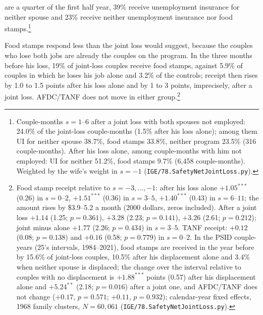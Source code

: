 are a quarter of the first half year, 39\% receive unemployment insurance for neither spouse and 23\% receive neither
unemployment insurance nor food stamps.\footnote{Couple-months $s = 1$--$6$ after a joint loss with both spouses
not employed: 24.0\% of the joint-loss couple-months (1.5\% after his loss alone); among them UI for neither spouse
38.7\%, food stamps 33.8\%, neither program 23.5\% (316 couple-months). After his loss alone, among couple-months with
him not employed: UI for neither 51.2\%, food stamps 9.7\% (6{,}458 couple-months). Weighted by the wife's weight in
$s = -1$ (\texttt{IGE/78.SafetyNetJointLoss.py}).}

Food stamps respond less than the joint loss would suggest, because the couples who lose both jobs are already the
couples on the program. In the three months before his loss, 19\% of joint-loss couples receive food stamps, against
5.9\% of couples in which he loses his job alone and 3.2\% of the controls; receipt then rises by 1.0 to 1.5 points after
his loss alone and by 1 to 3 points, imprecisely, after a joint loss. AFDC/TANF does not move in either
group.\footnote{Food stamp receipt relative to $s = -3, \dots, -1$: after his loss alone $+1.05^{***}$ (0.26) in
$s = 0$--$2$, $+1.51^{***}$ (0.36) in $s = 3$--$5$, $+1.40^{***}$ (0.43) in $s = 6$--$11$; the amount rises by
\$3.9--5.2 a month (2000 dollars, zeros included). After a joint loss $+1.14$ (1.25; $p=0.361$), $+3.28$ (2.23;
$p=0.141$), $+3.26$ (2.61; $p=0.212$); joint minus alone $+1.77$ (2.26; $p=0.434$) in $s = 3$--$5$. TANF receipt:
$+0.12$ (0.08; $p=0.138$) and $+0.16$ (0.58; $p=0.779$) in $s = 0$--$2$. In the PSID couple-years (25's intervals,
1984--2021), food stamps are received in the year before by 15.6\% of joint-loss couples, 10.5\% after his
displacement alone and 3.4\% when neither spouse is displaced; the change over the interval relative to couples with
no displacement is $+1.88^{***}$ points (0.57) after his displacement alone and $+5.24^{**}$ (2.18; $p=0.016$) after a
joint one, and AFDC/TANF does not change ($+0.17$, $p=0.571$; $+0.11$, $p=0.932$); calendar-year fixed effects, 1968
family clusters, $N = 60{,}061$ (\texttt{IGE/78.SafetyNetJointLoss.py}).}

